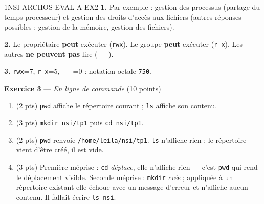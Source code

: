 \begin{corrige}{1NSI-ARCHOS-EVAL-A-EX2}
\textbf{1.} Par exemple : gestion des processus (partage du temps processeur) et gestion
des droits d'accès aux fichiers (autres réponses possibles : gestion de la mémoire,
gestion des fichiers).

\textbf{2.} Le propriétaire \textbf{peut} exécuter (\lstinline{rwx}). Le groupe
\textbf{peut} exécuter (\lstinline{r-x}). Les autres \textbf{ne peuvent pas} lire
(\lstinline{---}).

\textbf{3.} \lstinline{rwx}=$7$, \lstinline{r-x}=$5$, \lstinline{---}=$0$ : notation
octale \lstinline{750}.
\end{corrige}

\bigskip

\textbf{Exercice 3} --- \textit{En ligne de commande} \hfill (10 points)

\begin{enumerate}
  \item (2 pts) \lstinline{pwd} affiche le répertoire courant ; \lstinline{ls} affiche son
        contenu.
  \item (3 pts) \lstinline{mkdir nsi/tp1} puis \lstinline{cd nsi/tp1}.
  \item (2 pts) \lstinline{pwd} renvoie \lstinline{/home/leila/nsi/tp1}. \lstinline{ls}
        n'affiche rien : le répertoire vient d'être créé, il est vide.
  \item (3 pts) Première méprise : \lstinline{cd} \emph{déplace}, elle n'affiche rien — c'est
        \lstinline{pwd} qui rend le déplacement visible.
        Seconde méprise : \lstinline{mkdir} \emph{crée} ; appliquée à un répertoire existant
        elle échoue avec un message d'erreur et n'affiche aucun contenu. Il fallait écrire
        \lstinline{ls nsi}.
\end{enumerate}
